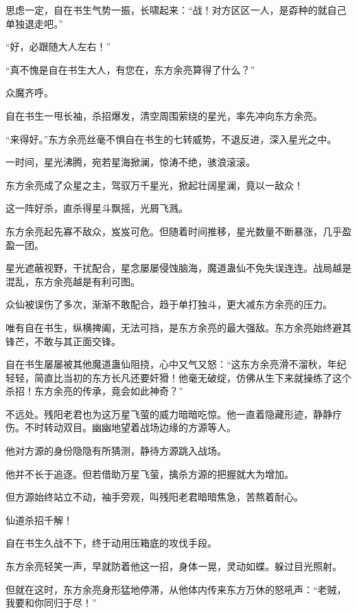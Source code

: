 
\begin{this_body}

思虑一定，自在书生气势一振，长啸起来：“战！对方区区一人，是孬种的就自己单独退走吧。”

“好，必跟随大人左右！”

“真不愧是自在书生大人，有您在，东方余亮算得了什么？”

众魔齐呼。

自在书生一甩长袖，杀招爆发，清空周围萦绕的星光，率先冲向东方余亮。

“来得好。”东方余亮丝毫不惧自在书生的七转威势，不退反进，深入星光之中。

一时间，星光沸腾，宛若星海掀澜，惊涛不绝，骇浪滚滚。

东方余亮成了众星之主，驾驭万千星光，掀起壮阔星澜，竟以一敌众！

这一阵好杀，直杀得星斗飘摇，光屑飞溅。

东方余亮起先寡不敌众，岌岌可危。但随着时间推移，星光数量不断暴涨，几乎盈盈一团。

星光遮蔽视野，干扰配合，星念屡屡侵蚀脑海，魔道蛊仙不免失误连连。战局越是混乱，东方余亮越是有利可图。

众仙被误伤了多次，渐渐不敢配合，趋于单打独斗，更大减东方余亮的压力。

唯有自在书生，纵横捭阖，无法可挡，是东方余亮的最大强敌。东方余亮始终避其锋芒，不敢与其正面交锋。

自在书生屡屡被其他魔道蛊仙阻挠，心中又气又怒：“这东方余亮滑不溜秋，年纪轻轻，简直比当初的东方长凡还要奸猾！他毫无破绽，仿佛从生下来就操练了这个杀招！东方余亮的传承，竟会如此神奇？”

不远处。残阳老君也为这万星飞萤的威力暗暗吃惊。他一直着隐藏形迹，静静疗伤。不时转动双目。幽幽地望着战场边缘的方源等人。

他对方源的身份隐隐有所猜测，静待方源跳入战场。

他并不长于追逐。但若借助万星飞萤，擒杀方源的把握就大为增加。

但方源始终站立不动，袖手旁观，叫残阳老君暗暗焦急，苦熬着耐心。

仙道杀招千解！

自在书生久战不下，终于动用压箱底的攻伐手段。

东方余亮轻笑一声，早就防着他这一招，身体一晃，灵动如蝶。躲过目光照射。

但就在这时，东方余亮身形猛地停滞，从他体内传来东方万休的怒吼声：“老贼，我要和你同归于尽！”


\end{this_body}
